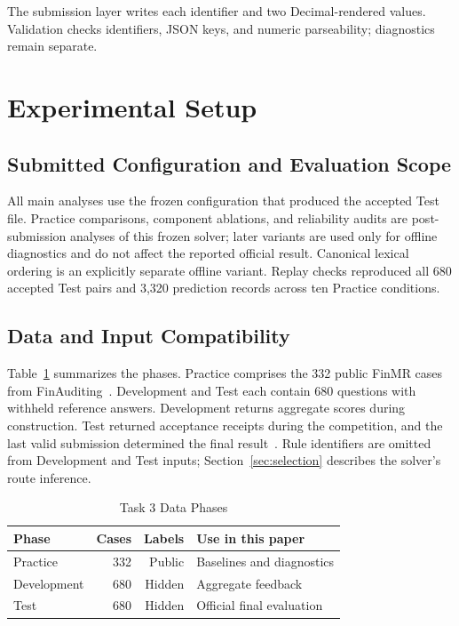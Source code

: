 \documentclass[conference]{IEEEtran}
\begin{document}
The submission layer writes each identifier and two Decimal-rendered values. Validation checks identifiers, JSON keys, and numeric parseability; diagnostics remain separate.

\section{Experimental Setup}
\label{sec:protocol}

\subsection{Submitted Configuration and Evaluation Scope}
All main analyses use the frozen configuration that produced the accepted Test file. Practice comparisons, component ablations, and reliability audits are post-submission analyses of this frozen solver; later variants are used only for offline diagnostics and do not affect the reported official result. Canonical lexical ordering is an explicitly separate offline variant. Replay checks reproduced all 680 accepted Test pairs and 3,320 prediction records across ten Practice conditions.

\subsection{Data and Input Compatibility}
Table~\ref{tab:data} summarizes the phases. Practice comprises the 332 public FinMR cases from FinAuditing~\cite{wang2026finauditing,task3data}. Development and Test each contain 680 questions with withheld reference answers. Development returns aggregate scores during construction. Test returned acceptance receipts during the competition, and the last valid submission determined the final result~\cite{task3submission}. Rule identifiers are omitted from Development and Test inputs; Section~\ref{sec:selection} describes the solver's route inference.

\begin{table}[t]
\caption{Task 3 Data Phases}
\label{tab:data}
\centering
\small
\begin{tabular}{lrrl}
\toprule
Phase & Cases & Labels & Use in this paper \\
\midrule
Practice & 332 & Public & Baselines and diagnostics \\
Development & 680 & Hidden & Aggregate feedback \\
Test & 680 & Hidden & Official final evaluation \\
\bottomrule
\end{tabular}
\end{table}
\end{document}
